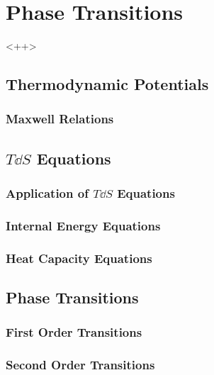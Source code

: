 \documentclass[../qm.tex]{subfiles}
\begin{document}
\chapter{Phase Transitions}
<++>
\section{Thermodynamic Potentials}
\subsection{Maxwell Relations}
\section{$T\dd S$ Equations}
\subsection{Application of $T\dd S$ Equations}
\subsection{Internal Energy Equations}
\subsection{Heat Capacity Equations}
\section{Phase Transitions}
\subsection{First Order Transitions}
\subsection{Second Order Transitions}
\end{document}
